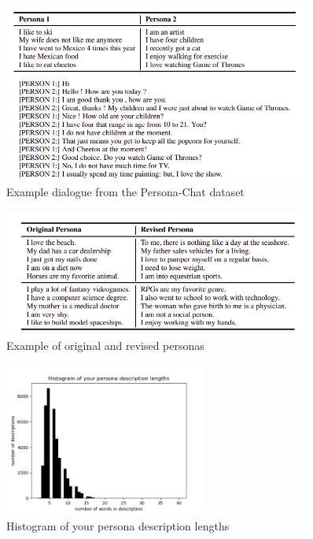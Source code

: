 \begin{figure}[hbt]
  \centering
  \includegraphics[width=0.9\textwidth]{figures/persona_chat.png}
  \caption{Example dialogue from the Persona-Chat dataset \cite{persona_chat}}
  \label{persona_chat}
\end{figure}

\begin{figure}[hbt]
  \centering
  \includegraphics[width=0.9\textwidth]{figures/persona.png}
  \caption{Example of original and revised personas \cite{persona_chat}}
  \label{revised_persona}
\end{figure}

\begin{figure}[hbt]
  \centering
  \includegraphics[width=0.6\textwidth]{figures/persona_desc.png}
  \caption{Histogram of your persona description lengths}
  \label{histogram_persona_desc}
\end{figure}

